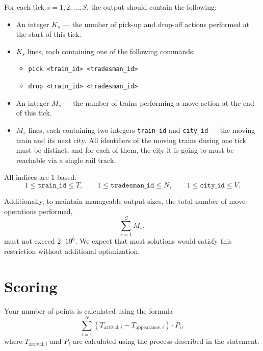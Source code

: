 \documentclass[11pt]{article}
\begin{document}
For each tick $s = 1,2,\ldots,S$, the output should contain the following:
\begin{itemize}
    \item An integer $K_s$ --- the number of pick-up and drop-off actions performed at the start of this tick.
    \item $K_s$ lines, each containing one of the following commands:
    \begin{itemize}
        \item \texttt{pick <train\_id> <tradesman\_id>}
        \item \texttt{drop <train\_id> <tradesman\_id>}
    \end{itemize}
    \item An integer $M_s$ --- the number of trains performing a move action at the end of this tick.
    \item $M_s$ lines, each containing two integers \texttt{train\_id} and \texttt{city\_id} --- the moving train and its next city. All identifiers of the moving trains during one tick must be distinct, and for each of them, the city it is going to must be reachable via a single rail track.
\end{itemize}

All indices are $1$-based:
\[
1 \le \texttt{train\_id} \le T,\qquad
1 \le \texttt{tradesman\_id} \le N,\qquad
1 \le \texttt{city\_id} \le V.
\]

Additionally, to maintain manageable output sizes, the total number of move operations performed,
\[
\sum_{s=1}^{S} M_s,
\]
must not exceed $2 \cdot 10^6$. We expect that most solutions would satisfy this restriction without additional optimization.

\section*{Scoring}

Your number of points is calculated using the formula
\[
\sum_{i=1}^{N} \left(T_{\text{arrival},i} - T_{\text{appearance},i}\right)\cdot P_i,
\]
where $T_{\text{arrival},i}$ and $P_i$ are calculated using the process described in the statement.
\end{document}
